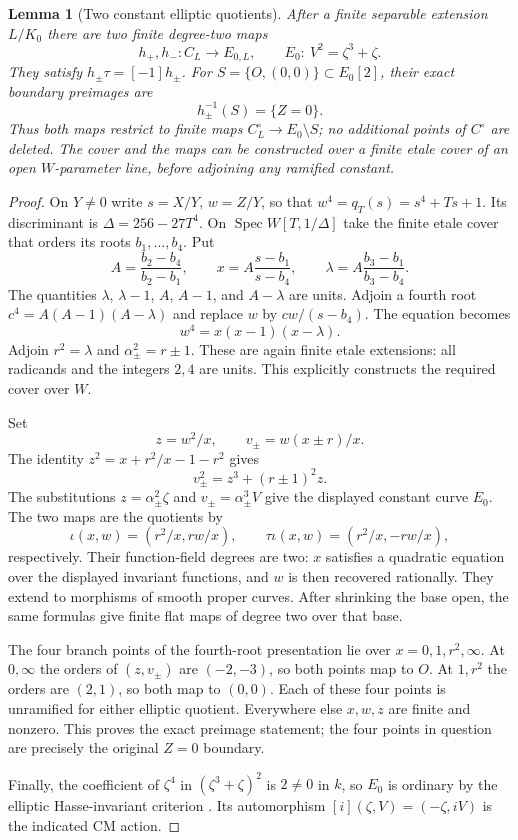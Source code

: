 \documentclass[11pt,a4paper]{article}
\newtheorem{lemma}[theorem]{Lemma}
\theoremstyle{remark}
\begin{document}
\begin{lemma}[Two constant elliptic quotients]
\label{lem:quarticconstantquotients}
After a finite separable extension $L/K_0$ there are two finite
degree-two maps
\[
 h_+,h_-:C_L\longrightarrow E_{0,L},
 \qquad E_0:\ V^2=\zeta^3+\zeta.
\]
They satisfy $h_\pm\tau=[-1]h_\pm$. For
$S=\{O,(0,0)\}\subset E_0[2]$, their exact boundary preimages are
\[
 h_\pm^{-1}(S)=\{Z=0\}.
\]
Thus both maps restrict to finite maps $C_L^\circ\to E_0\setminus S$;
no additional points of $C^\circ$ are deleted.
The cover and the maps can be constructed over a finite etale cover
of an open $W$-parameter line, before adjoining any ramified constant.
\end{lemma}
\begin{proof}
On $Y\ne0$ write $s=X/Y$, $w=Z/Y$, so that
$w^4=q_T(s)=s^4+Ts+1$. Its discriminant is
$\Delta=256-27T^4$. On $\operatorname{Spec}W[T,1/\Delta]$ take the
finite etale cover that orders its roots $b_1,\ldots,b_4$. Put
\[
 A=\frac{b_2-b_4}{b_2-b_1},\qquad
 x=A\frac{s-b_1}{s-b_4},\qquad
 \lambda=A\frac{b_3-b_1}{b_3-b_4}.
\]
The quantities $\lambda$, $\lambda-1$, $A$, $A-1$, and
$A-\lambda$ are units. Adjoin a fourth root
$c^4=A(A-1)(A-\lambda)$ and replace $w$ by $cw/(s-b_4)$.
The equation becomes
\[
 w^4=x(x-1)(x-\lambda).
\]
Adjoin $r^2=\lambda$ and $\alpha_\pm^2=r\pm1$. These are again
finite etale extensions: all radicands and the integers $2,4$ are
units. This explicitly constructs the required cover over $W$.

Set
\[
 z=w^2/x,\qquad v_\pm=w(x\pm r)/x.
\]
The identity $z^2=x+r^2/x-1-r^2$ gives
\[
 v_\pm^2=z^3+(r\pm1)^2z.
\]
The substitutions $z=\alpha_\pm^2\zeta$ and
$v_\pm=\alpha_\pm^3V$ give the displayed constant curve $E_0$.
The two maps are the quotients by
\[
 \iota(x,w)=(r^2/x,rw/x),\qquad \tau\iota(x,w)=(r^2/x,-rw/x),
\]
respectively. Their function-field degrees are two: $x$ satisfies
a quadratic equation over the displayed invariant functions, and
$w$ is then recovered rationally. They extend to morphisms of smooth
proper curves. After shrinking the base open, the same formulas give
finite flat maps of degree two over that base.

The four branch points of the fourth-root presentation lie over
$x=0,1,r^2,\infty$. At $0,\infty$ the orders of $(z,v_\pm)$ are
$(-2,-3)$, so both points map to $O$. At $1,r^2$ the orders are
$(2,1)$, so both map to $(0,0)$. Each of these four points is
unramified for either elliptic quotient. Everywhere else $x,w,z$
are finite and nonzero. This proves the exact preimage statement;
the four points in question are precisely the original $Z=0$ boundary.

Finally, the coefficient of $\zeta^4$ in
$(\zeta^3+\zeta)^2$ is $2\ne0$ in $k$, so $E_0$ is ordinary by
the elliptic Hasse-invariant criterion
\cite[Theorem~V.4.1(a)]{SilvermanAEC}. Its automorphism
$[i](\zeta,V)=(-\zeta,iV)$ is the indicated CM action.
\end{proof}
\end{document}
